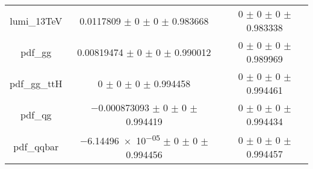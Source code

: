 \begin{table}
\begin{tabular}{ccc}
lumi\_13TeV & \num{0.0117809} $\pm$ \num{0} $\pm$ \num{0} $\pm$ \num{0.983668} & \num{0} $\pm$ \num{0} $\pm$ \num{0} $\pm$ \num{0.983338}\\
pdf\_gg & \num{0.00819474} $\pm$ \num{0} $\pm$ \num{0} $\pm$ \num{0.990012} & \num{0} $\pm$ \num{0} $\pm$ \num{0} $\pm$ \num{0.989969}\\
pdf\_gg\_ttH & \num{0} $\pm$ \num{0} $\pm$ \num{0} $\pm$ \num{0.994458} & \num{0} $\pm$ \num{0} $\pm$ \num{0} $\pm$ \num{0.994461}\\
pdf\_qg & \num{-0.000873093} $\pm$ \num{0} $\pm$ \num{0} $\pm$ \num{0.994419} & \num{0} $\pm$ \num{0} $\pm$ \num{0} $\pm$ \num{0.994434}\\
pdf\_qqbar & \num{-6.14496e-05} $\pm$ \num{0} $\pm$ \num{0} $\pm$ \num{0.994456} & \num{0} $\pm$ \num{0} $\pm$ \num{0} $\pm$ \num{0.994457}\\
\bottomrule
\end{tabular}
\end{table}
